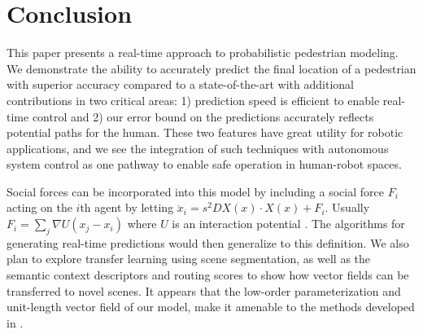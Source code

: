 \documentclass[letterpaper,10pt,conference]{ieeeconf}
\begin{document}
\section{Conclusion} 
\label{sec:conclusion}
This paper presents a real-time approach to probabilistic pedestrian modeling. 
We demonstrate the ability to accurately predict the final location of a pedestrian with superior accuracy compared to a state-of-the-art with additional contributions in two critical areas: 1) prediction speed is efficient to enable real-time control and 2) our error bound on the predictions accurately reflects potential paths for the human. 
These two features have great utility for robotic applications, and we see the integration of such techniques with autonomous system control as one pathway to enable safe operation in human-robot spaces. 

Social forces can be incorporated into this model by
	including a social force $F_{i}$ acting on the $i$th agent by letting $\ddot{x}_i = s^2 DX(x) \cdot X(x) + F_i$.  
	Usually $F_{i} = \sum_{j} \nabla U( x_j - x_i)$ where $U$ is an interaction potential \cite{Helbing1995}. 
	The algorithms for generating real-time predictions would then generalize to this definition.
	We also plan to explore transfer learning using scene segmentation, as well as the semantic context descriptors and routing scores to show how vector fields can be transferred to novel scenes. It appears that the low-order parameterization and unit-length vector field of our model, make it amenable to the methods developed in \cite{Ballan2016}.

\end{document}
